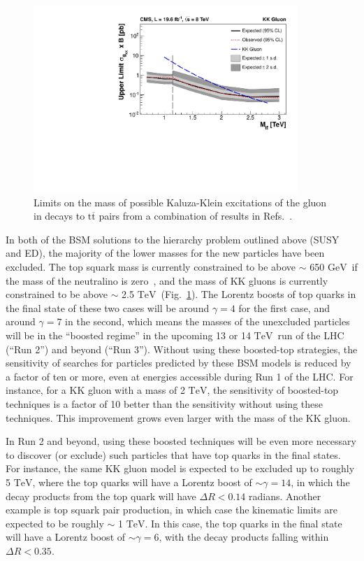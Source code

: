 \documentclass[12pt]{proposalnsf}
\newcommand{\TeV}{\ensuremath{\mathrm{TeV}}}
\newcommand{\GeVcc}{\ensuremath{\mathrm{GeV}}}
\newcommand{\TeVcc}{\ensuremath{\mathrm{TeV}}}
\newcommand{\ttbar}        {\ensuremath{\mathrm{t}\overline{\mathrm{t}}}}
\begin{document}
\begin{figure}[h!]
    \centering
    \includegraphics[width=100mm]{limits-kk_combined}
    \caption{\label{fig:limits-kk_combined}Limits on the mass of
      possible Kaluza-Klein excitations of the gluon in decays to
      $\ttbar$ pairs from a combination of results in
      Refs.~\cite{B2G-12-005,B2G-12-006}. }
\end{figure}


In both of the BSM solutions to the hierarchy problem outlined above
(SUSY and ED), the majority of the
lower masses for the new particles have been excluded. The top squark
mass is currently
constrained to be above $\sim$ 650 \GeVcc\ if the mass of the
neutralino is zero~\cite{SUS-13-011}, and the mass of
KK gluons is currently constrained to be
above $\sim$ 2.5 \TeVcc\ (Fig.~\ref{fig:limits-kk_combined}).
The Lorentz boosts of top quarks in the final state of these two cases
will be around $\gamma=4$ for the first case, and around $\gamma=7$ in
the second, which means the masses of the unexcluded particles will be
in the ``boosted regime'' in the upcoming 13 or 14 \TeV\ run of the
LHC (``Run 2'') and beyond (``Run 3''). Without using these
boosted-top strategies, the
sensitivity of searches for particles predicted by these BSM models is
reduced by a factor of ten or more, even at energies accessible during
Run 1 of the LHC. For instance, for a KK gluon with a mass of 2
\TeVcc, the sensitivity of boosted-top techniques is a factor of 10
better than the sensitivity without using these techniques. This
improvement grows even larger with the mass of the KK gluon. 

In Run 2 and beyond, using these boosted techniques will be even more
necessary to discover (or exclude) such particles that have
top quarks in the final states. For instance, the same KK gluon
model is expected to be excluded up to roughly 5 \TeVcc, where the top
quarks will have a Lorentz boost of $\sim\gamma=14$, in which the decay
products from the top quark will have $\Delta R < 0.14$
radians. Another example is top squark pair production, in
which case the kinematic limits are expected to be roughly $\sim$ 1
\TeVcc. In this case, the top quarks in the final state will have a
Lorentz boost of $\sim\gamma=6$, with the decay products falling
within $\Delta R < 0.35$. 
\end{document}
